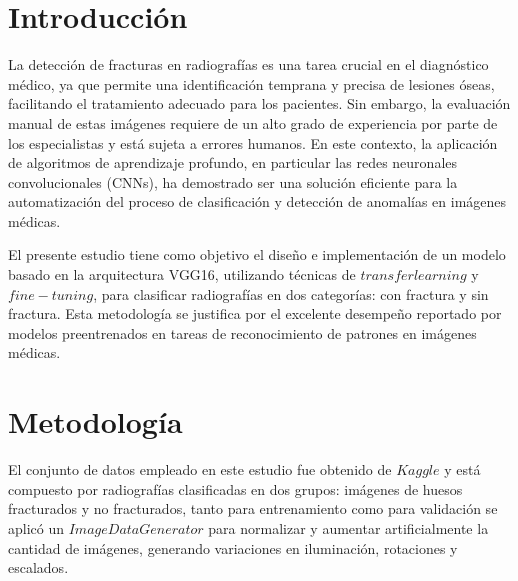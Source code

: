 \documentclass[journal]{IEEEtran}
\begin{document}



\section{Introducción}
% 
% 
% 
% 
\IEEEPARstart
{L}{a} detección de fracturas en radiografías es una tarea crucial en el diagnóstico médico, ya que permite una identificación temprana y precisa de lesiones óseas, facilitando el tratamiento adecuado para los pacientes. Sin embargo, la evaluación manual de estas imágenes requiere de un alto grado de experiencia por parte de los especialistas y está sujeta a errores humanos. En este contexto, la aplicación de algoritmos de aprendizaje profundo, en particular las redes neuronales convolucionales (CNNs), ha demostrado ser una solución eficiente para la automatización del proceso de clasificación y detección de anomalías en imágenes médicas.

El presente estudio tiene como objetivo el diseño e implementación de un modelo basado en la arquitectura VGG16, utilizando técnicas de $transfer learning$ y $fine-tuning$, para clasificar radiografías en dos categorías: con fractura y sin fractura. Esta metodología se justifica por el excelente desempeño reportado por modelos preentrenados en tareas de reconocimiento de patrones en imágenes médicas.

\section{Metodología}
El conjunto de datos empleado en este estudio fue obtenido de $Kaggle$ y está compuesto por radiografías clasificadas en dos grupos: imágenes de huesos fracturados y no fracturados, tanto para entrenamiento como para validación se aplicó un $ImageDataGenerator$ para normalizar y aumentar artificialmente la cantidad de imágenes, generando variaciones en iluminación, rotaciones y escalados.
\end{document}
